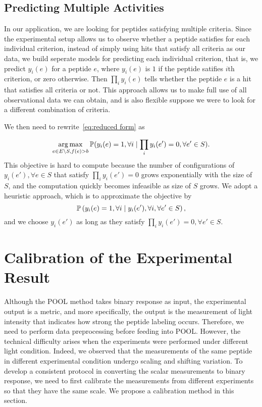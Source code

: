 \subsection{Predicting Multiple Activities} \label{sec:extension}
In our application, we are looking for peptides satisfying multiple criteria. Since the experimental setup allows us to observe whether
a peptide satisfies for each individual criterion, instead of simply using hits that satisfy all criteria as our data, we build
seperate models for predicting each individual criterion, that is, we predict $y_i(e)$ for a peptide $e$, where $y_i(e)$ is $1$ if
the peptide satifies $i$th criterion, or zero otherwise. Then $\prod_i y_i(e)$ tells whether the peptide $e$ is a hit that satisfies
all criteria or not. This approach allows us to make full use of all observational data we can obtain, and is also flexible suppose we were to look for a
different combination of criteria.

We then need to rewrite~\eqref{eq:reduced form} as

\begin{equation*}
  \underset{e \in E \backslash S, f(e) > b}{\mathrm{arg}\max} \, \mathbb{P} (y_i(e)=1, \forall i \mid \prod_i y_i(e') = 0, \forall e' \in S).
\end{equation*}
This objective is hard to compute because the number of configurations of $y_i(e'), \forall e \in S$ that satisfy $\prod_i y_i(e') = 0$ grows exponentially with the size of $S$, and the computation quickly becomes infeasible as size of $S$ grows. We adopt a heuristic approach, which is to approximate the objective by
\begin{equation*}
  \mathbb{P} \left( y_i(e)=1, \forall i \mid y_i(e'), \forall i, \forall e' \in S \right),
\end{equation*}
and we choose $y_i(e')$ as long as they satisfy $\prod_i y_i(e') = 0, \forall e' \in S$.

\section{Calibration of the Experimental Result}
Although the POOL method takes binary response as input, the experimental output is a metric, and more specifically, the output is the measurement of light
intensity that indicates how strong the peptide labeling occurs. Therefore, we need to perform data preprocessing before feeding into POOL. However, the
technical difficulty arises when the experiments were performed under different light condition. Indeed, we observed that the measurements of the same peptide
in different experimental condition undergo scaling and shifting variation. To develop a consistent protocol in converting the scalar measurements to binary
response, we need to first calibrate the measurements from different experiments so that they have the same scale. We propose a calibration method in
this section.

